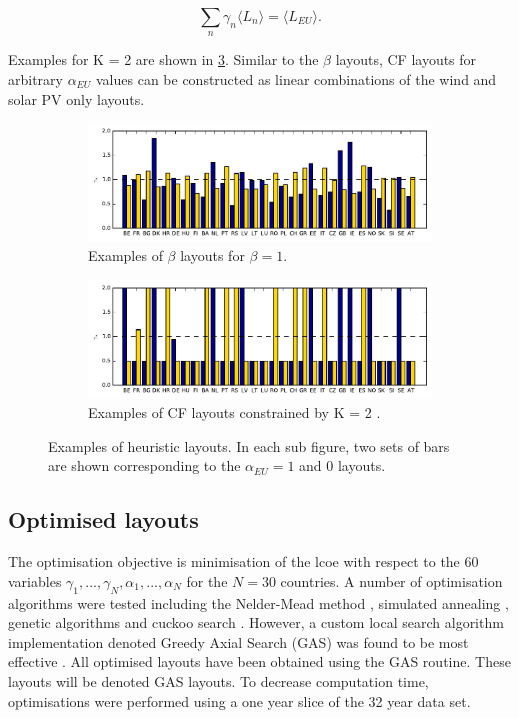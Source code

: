 \documentclass[a4paper, 5p, sort&compress]{elsarticle}%
\newcommand{\mean}[1]{\langle #1 \rangle}
\newcommand{\chromowidth}{1.00 \columnwidth}
\begin{document}
\begin{equation}
  \label{eq:5}
  \sum_{n} \gamma_{n} \mean{L_{n}} = \mean{L_{EU}}.
\end{equation}

Examples for K = 2 are shown in
\cref{fig:examples}. Similar to the $\beta$ layouts, CF layouts for
arbitrary $\alpha_{EU}$ values can be constructed as linear combinations of the
wind and solar PV only layouts.

\begin{figure}[t!]
  \centering
  \begin{subfigure}{2\columnwidth}
    \includegraphics[width = \chromowidth, center]{beta=1}
    \caption{Examples of $\beta$ layouts for $\beta = 1$.}
    \label{fig:betaExamples}
  \end{subfigure}
  \begin{subfigure}{2\columnwidth}
    \includegraphics[width = \chromowidth, center]{k=2cfMax}
    \caption{Examples of CF layouts constrained by K = 2 .}
    \label{fig:cfMaxExamples}
  \end{subfigure}
  \caption{Examples of heuristic layouts. In each sub figure, two sets
    of bars are shown corresponding to the $\alpha_{EU} = 1$ and $0$
    layouts.}
  \label{fig:examples}
\end{figure}

\subsection{Optimised layouts}
\label{sec:optimized-layouts}

The optimisation objective is minimisation of the \gls{lcoe} with respect to
the 60 variables
$\gamma_{1}, ..., \gamma_{N}, \alpha_{1}, ..., \alpha_{N}$ for the $N=30$ countries.  A number of optimisation
algorithms were tested including the Nelder-Mead method \cite{nelder},
simulated annealing \cite{sa}, genetic algorithms \cite{ga} and cuckoo
search \cite{cs}. However, a custom local search algorithm
implementation denoted Greedy Axial Search (GAS) %
was found to be most effective \cite{emil}. All optimised layouts have
been obtained using the GAS routine. These layouts will be denoted GAS
layouts. To decrease computation time, optimisations were performed
using a one year slice of the 32 year data set.
\end{document}
